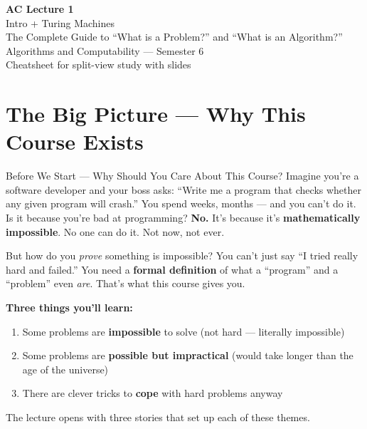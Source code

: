 \documentclass[11pt,a4paper]{article}
\begin{document}
\begin{center}
{\Huge\bfseries AC Lecture 1}\\[0.5em]
{\LARGE Intro + Turing Machines}\\[0.3em]
{\large The Complete Guide to ``What is a Problem?'' and ``What is an Algorithm?''}\\[1em]
{\normalsize Algorithms and Computability --- Semester 6}\\
{\normalsize Cheatsheet for split-view study with slides}
\end{center}

\vspace{1em}
\tableofcontents
\newpage

\section{The Big Picture --- Why This Course Exists}

\begin{conceptbox}{Before We Start --- Why Should You Care About This Course?}
Imagine you're a software developer and your boss asks: ``Write me a program that checks whether any given program will crash.'' You spend weeks, months --- and you can't do it. Is it because you're bad at programming? \textbf{No.} It's because it's \textbf{mathematically impossible}. No one can do it. Not now, not ever.

But how do you \textit{prove} something is impossible? You can't just say ``I tried really hard and failed.'' You need a \textbf{formal definition} of what a ``program'' and a ``problem'' even \textit{are}. That's what this course gives you.

\textbf{Three things you'll learn:}
\begin{enumerate}[nosep]
\item Some problems are \textbf{impossible} to solve (not hard --- literally impossible)
\item Some problems are \textbf{possible but impractical} (would take longer than the age of the universe)
\item There are clever tricks to \textbf{cope} with hard problems anyway
\end{enumerate}

The lecture opens with three stories that set up each of these themes.
\end{conceptbox}
\end{document}
